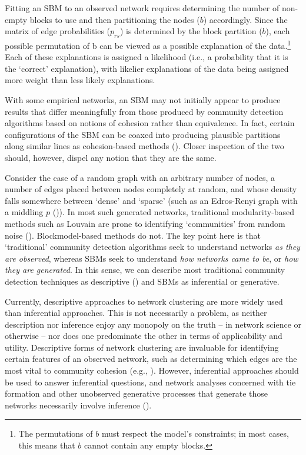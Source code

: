 \documentclass[
  12pt,
  a4paper,
  DIV=11,
  numbers=noendperiod,
  twoside,
  open=any]{scrartcl}
\begin{document}
Fitting an SBM to an observed network requires determining the number of
non-empty blocks to use and then partitioning the nodes (\(b\))
accordingly. Since the matrix of edge probabilities (\(p_{rs}\)) is
determined by the block partition (\(b\)), each possible permutation of
b can be viewed as a possible explanation of the data.\footnote{The
  permutations of \(b\) must respect the model's constraints; in most
  cases, this means that \(b\) cannot contain any empty blocks.} Each of
these explanations is assigned a likelihood (i.e., a probability that it
is the `correct' explanation), with likelier explanations of the data
being assigned more weight than less likely explanations.

With some empirical networks, an SBM may not initially appear to produce
results that differ meaningfully from those produced by community
detection algorithms based on notions of cohesion rather than
equivalence. In fact, certain configurations of the SBM can be coaxed
into producing plausible partitions along similar lines as
cohesion-based methods (). Closer inspection of the two should, however, dispel any
notion that they are the same.

Consider the case of a random graph with an arbitrary number of nodes, a
number of edges placed between nodes completely at random, and whose
density falls somewhere between `dense' and `sparse' (such as an
Edros-Renyi graph with a middling \(p\)
()). In most such
generated networks, traditional modularity-based methods such as Louvain
are prone to identifying `communities' from random noise
(). Blockmodel-based
methods do not. The key point here is that `traditional' community
detection algorithms seek to understand networks \emph{as they are
observed}, whereas SBMs seek to understand \emph{how networks came to
be}, or \emph{how they are generated}. In this sense, we can describe
most traditional community detection techniques as descriptive
() and SBMs as
inferential or generative.

Currently, descriptive approaches to network clustering are more widely
used than inferential approaches. This is not necessarily a problem, as
neither description nor inference enjoy any monopoly on the truth -- in
network science or otherwise -- nor does one predominate the other in
terms of applicability and utility. Descriptive forms of network
clustering are invaluable for identifying certain features of an
observed network, such as determining which edges are the most vital to
community cohesion (e.g., ). However, inferential approaches should be used to
answer inferential questions, and network analyses concerned with tie
formation and other unobserved generative processes that generate those
networks necessarily involve inference
().
\end{document}

